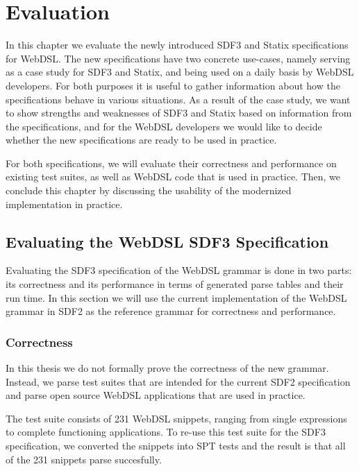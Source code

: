 
\chapter{\label{chap:evaluation}Evaluation}

In this chapter we evaluate the newly introduced SDF3 and Statix specifications for WebDSL. The new specifications have two concrete use-cases, namely serving as a case study for SDF3 and Statix, and being used on a daily basis by WebDSL developers. For both purposes it is useful to gather information about how the specifications behave in various situations. As a result of the case study, we want to show strengths and weaknesses of SDF3 and Statix based on information from the specifications, and for the WebDSL developers we would like to decide whether the new specifications are ready to be used in practice.

For both specifications, we will evaluate their correctness and performance on existing test suites, as well as WebDSL code that is used in practice. Then, we conclude this chapter by discussing the usability of the modernized implementation in practice.

\section{\label{sec:eval-sdf3}Evaluating the WebDSL SDF3 Specification}

  Evaluating the SDF3 specification of the WebDSL grammar is done in two parts: its correctness and its performance in terms of generated parse tables and their run time. In this section we will use the current implementation of the WebDSL grammar in SDF2 as the reference grammar for correctness and performance.

  \subsection{Correctness}

    In this thesis we do not formally prove the correctness of the new grammar. Instead, we parse test suites that are intended for the current SDF2 specification and parse open source WebDSL applications that are used in practice.

    The test suite consists of 231 WebDSL snippets, ranging from single expressions to complete functioning applications. To re-use this test suite for the SDF3 specification, we converted the snippets into SPT tests and the result is that all of the 231 snippets parse succesfully.

